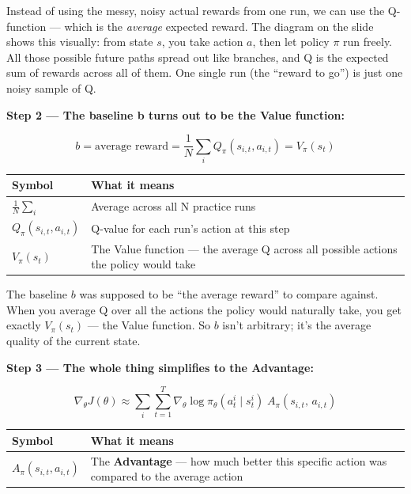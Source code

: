 Instead of using the messy, noisy actual rewards from one run, we can use the Q-function --- which is the \textit{average} expected reward. The diagram on the slide shows this visually: from state $s$, you take action $a$, then let policy $\pi$ run freely. All those possible future paths spread out like branches, and Q is the expected sum of rewards across all of them. One single run (the ``reward to go'') is just one noisy sample of Q.

\medskip

\textbf{Step 2 --- The baseline b turns out to be the Value function:}

\[
b = \text{average reward} = \frac{1}{N} \sum_i Q_\pi(s_{i,t}, a_{i,t}) = V_\pi(s_t)
\]

\begin{center}
\begin{tabular}{ll}
\hline
Symbol & What it means \\
\hline
$\frac{1}{N}\sum_i$ & Average across all N practice runs \\
$Q_\pi(s_{i,t}, a_{i,t})$ & Q-value for each run's action at this step \\
$V_\pi(s_t)$ & The Value function --- the average Q across all possible actions the policy would take \\
\hline
\end{tabular}
\end{center}

The baseline $b$ was supposed to be ``the average reward'' to compare against. When you average Q over all the actions the policy would naturally take, you get exactly $V_\pi(s_t)$ --- the Value function. So $b$ isn't arbitrary; it's the average quality of the current state.

\medskip

\textbf{Step 3 --- The whole thing simplifies to the Advantage:}

\[
\nabla_\theta J(\theta) \approx \sum_i \sum_{t=1}^{T} \nabla_\theta \log\pi_\theta(a_t^i \mid s_t^i) \; A_\pi(s_{i,t},\, a_{i,t})
\]

\begin{center}
\begin{tabular}{ll}
\hline
Symbol & What it means \\
\hline
$A_\pi(s_{i,t}, a_{i,t})$ & The \textbf{Advantage} --- how much better this specific action was compared to the average action \\
\hline
\end{tabular}
\end{center}

